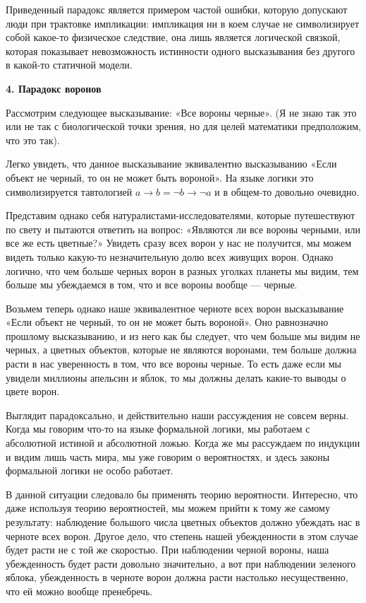 Приведенный парадокс является примером частой ошибки, которую допускают люди при трактовке импликации: импликация ни в коем случае не символизирует собой  какое-то физическое следствие, она лишь является логической связкой, которая показывает невозможность истинности одного высказывания без другого в какой-то статичной модели.

{\bfseries 4. Парадокс воронов}

Рассмотрим следующее высказывание: «Все вороны черные». (Я не знаю так это или не так с биологической точки зрения, но для целей математики предположим, что это так).

Легко увидеть, что данное высказывание эквивалентно высказыванию «Если объект не черный, то он не может быть вороной». На языке логики это символизируется тавтологией $a\rightarrow b = \neg b \rightarrow \neg a$ и в общем-то довольно очевидно.

Представим однако себя натуралистами-исследователями, которые путешествуют по свету и пытаются ответить на вопрос: «Являются ли все вороны черными, или все же есть цветные?» Увидеть сразу всех ворон у нас не получится, мы можем видеть только какую-то незначительную долю всех живущих ворон. Однако логично, что чем больше черных ворон в разных уголках планеты мы видим, тем больше мы убеждаемся в том, что и все вороны вообще — черные.

Возьмем теперь однако наше эквивалентное черноте всех ворон высказывание «Если объект не черный, то он не может быть вороной». Оно равнозначно прошлому высказыванию, и из него как бы следует, что чем больше мы видим не черных, а цветных объектов, которые не являются воронами, тем больше должна расти в нас уверенность в том, что все вороны черные. То есть даже если мы увидели миллионы апельсин и яблок, то мы должны делать какие-то выводы о цвете ворон.

Выглядит парадоксально, и действительно наши рассуждения не совсем верны. Когда мы говорим что-то на языке формальной логики, мы работаем с абсолютной истиной и абсолютной ложью. Когда же мы рассуждаем по индукции и видим лишь часть мира, мы уже говорим о вероятностях, и здесь законы формальной логики не особо работает.

В данной ситуации следовало бы применять теорию вероятности. Интересно, что даже используя теорию вероятностей, мы можем прийти к тому же самому результату: наблюдение большого числа цветных объектов должно убеждать нас в черноте всех ворон. Другое дело, что степень нашей убежденности в этом случае будет расти не с той же скоростью. При наблюдении черной вороны, наша убежденность будет расти довольно значительно, а вот при наблюдении зеленого яблока, убежденность в черноте ворон должна расти настолько несущественно, что ей можно вообще пренебречь.

